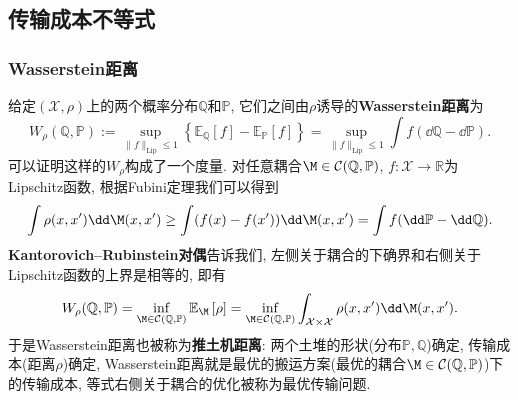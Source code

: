 \subsection{传输成本不等式}

\subsubsection{Wasserstein距离}

给定$(\mathcal{X}, \rho)$上的两个概率分布$\mathbb{Q}$和$\mathbb{P}$, 它们之间由$\rho$诱导的\textbf{Wasserstein距离}为
\begin{equation*}
	W_{\rho}(\mathbb{Q}, \mathbb{P}) 
	:= \sup_{\|f\|_{\text{Lip}} \leq 1} \left\{ \mathbb{E}_{\mathbb{Q}} [f] - \mathbb{E}_{\mathbb{P}} [f] \right\}
	= \sup_{\|f\|_{\text{Lip}} \leq 1} \int f (\dd \mathbb{Q} - \dd \mathbb{P}). 
\end{equation*}
可以证明这样的$W_{\rho}$构成了一个度量. 
对任意耦合$\M \in \mathcal{C}(\mathbb{Q}, \mathbb{P})$, $f \colon \mathcal{X} \to \mathbb{R}$为Lipschitz函数, 根据Fubini定理我们可以得到
\begin{equation*}
	\int \rho(x, x') \dd \M(x, x')
	\geq \int (f(x) - f(x')) \dd \M(x, x')
	= \int f(\dd \mathbb{P} - \dd \mathbb{Q}). 
\end{equation*}
\textbf{Kantorovich–Rubinstein对偶}告诉我们, 左侧关于耦合的下确界和右侧关于Lipschitz函数的上界是相等的, 即有
\begin{equation*}
	W_{\rho}(\mathbb{Q}, \mathbb{P})
	= \inf_{\M \in \mathcal{C}(\mathbb{Q}, \mathbb{P})} \mathbb{E}_{\M} \left[ \rho \right]
	= \inf_{\M \in \mathcal{C}(\mathbb{Q}, \mathbb{P})} \int_{\mathcal{X} \times \mathcal{X}} \rho(x, x') \dd \M(x, x'). 
\end{equation*}
于是Wasserstein距离也被称为\textbf{推土机距离}: 两个土堆的形状(分布$\mathbb{P}, \mathbb{Q}$)确定, 传输成本(距离$\rho$)确定, Wasserstein距离就是最优的搬运方案(最优的耦合$\M \in \mathcal{C}(\mathbb{Q}, \mathbb{P})$)下的传输成本, 等式右侧关于耦合的优化被称为最优传输问题. 

